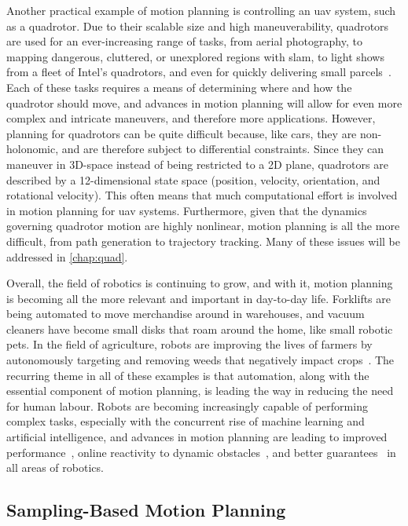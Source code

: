 Another practical example of motion planning is controlling an \gls{uav} system, such as a quadrotor. Due to their scalable size and high maneuverability, quadrotors are used for an ever-increasing range of tasks, from aerial photography, to mapping dangerous, cluttered, or unexplored regions with \gls{slam}, to light shows from a fleet of Intel's quadrotors, and even for quickly delivering small parcels~\cite{Yang2013, Richter2013}. Each of these tasks requires a means of determining where and how the quadrotor should move, and advances in motion planning will allow for even more complex and intricate maneuvers, and therefore more applications. However, planning for quadrotors can be quite difficult because, like cars, they are non-holonomic, and are therefore subject to differential constraints. Since they can maneuver in 3D-space instead of being restricted to a 2D plane, quadrotors are described by a 12-dimensional state space (position, velocity, orientation, and rotational velocity). This often means that much computational effort is involved in motion planning for \gls{uav} systems. Furthermore, given that the dynamics governing quadrotor motion are highly nonlinear, motion planning is all the more difficult, from path generation to trajectory tracking. Many of these issues will be addressed in \autoref{chap:quad}.

Overall, the field of robotics is continuing to grow, and with it, motion planning is becoming all the more relevant and important in day-to-day life. Forklifts are being automated to move merchandise around in warehouses, and vacuum cleaners have become small disks that roam around the home, like small robotic pets. In the field of agriculture, robots are improving the lives of farmers by autonomously targeting and removing weeds that negatively impact crops~\cite{Wendel2016}. The recurring theme in all of these examples is that automation, along with the essential component of motion planning, is leading the way in reducing the need for human labour. Robots are becoming increasingly capable of performing complex tasks, especially with the concurrent rise of machine learning and artificial intelligence, and advances in motion planning are leading to improved performance~\cite{Greeff2018}, online reactivity to dynamic obstacles~\cite{Allen2016}, and better guarantees~\cite{Lin2014} in all areas of robotics.



\subsection{Sampling-Based Motion Planning}\label{intro:sbmp}

